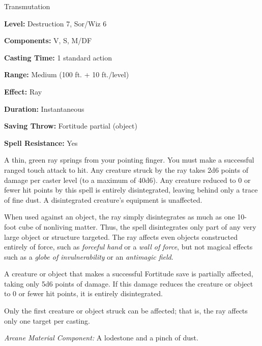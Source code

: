 
Transmutation

\textbf{Level:} Destruction 7, Sor/Wiz 6

\textbf{Components:} V, S, M/DF

\textbf{Casting Time:} 1 standard action

\textbf{Range:} Medium (100 ft. + 10 ft./level)

\textbf{Effect:} Ray

\textbf{Duration:} Instantaneous

\textbf{Saving Throw:} Fortitude partial (object)

\textbf{Spell Resistance:} Yes

A thin, green ray springs from your pointing finger. You must make a successful 
ranged touch attack to hit. Any creature struck by the ray takes 2d6 points of 
damage per caster level (to a maximum of 40d6). Any creature reduced to 0 or fewer 
hit points by this spell is entirely disintegrated, leaving behind only a trace 
of fine dust. A disintegrated creature's equipment is unaffected.

When used against an object, the ray simply disintegrates as much as one 10- foot 
cube of nonliving matter. Thus, the spell disintegrates only part of any very large 
object or structure targeted. The ray affects even objects constructed entirely 
of force, such as \textit{forceful hand} or a \textit{wall of force}, but not magical 
effects such as a \textit{globe of invulnerability} or an \textit{antimagic field}.

A creature or object that makes a successful Fortitude save is partially affected, 
taking only 5d6 points of damage. If this damage reduces the creature or object 
to 0 or fewer hit points, it is entirely disintegrated.

Only the first creature or object struck can be affected; that is, the ray affects 
only one target per casting.

\textit{Arcane Material Component:} A lodestone and a pinch of dust.

